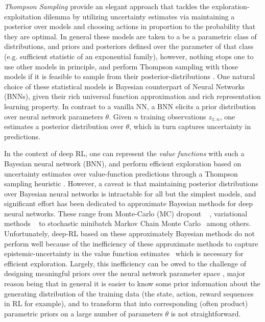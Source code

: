 \documentclass[10pt]{article}
\begin{document}
\textit{Thompson Sampling} \citep{thompson1933likelihood, russo2018tutorial, riquelme2018deep} provide an elegant approach that tackles the exploration-exploitation dilemma by utilizing uncertainty estimates via maintaining a posterior over models and choosing actions in proportion to the probability that they are optimal. In general these models are taken to a be a parametric class of distributions, and priors and posteriors defined over the parameter of that class (e.g. sufficient statistic of an exponential family), however, nothing stops one to use other models in principle, and perform Thompson sampling with those models if it is feasible to sample from their posterior-distributions \cite{riquelme2018deep}. One natural choice of these statistical models is Bayesian counterpart of Neural Networks (BNNs), given their rich universal function approximation and rich representation learning property. In contrast to a vanilla NN, a BNN elicits a prior distribution over neural network parameters $\theta$. Given $n$ training observations $z_{1:n}$, one estimates a posterior distribution over $\theta$, which in turn
captures uncertainty in predictions.  

In the context of deep RL,  one can represent the \textit{value functions} with such a Bayesian neural network (BNN), and perform efficient exploration based on uncertainty estimates over value-function predictions through a Thompson sampling heuristic . However, a caveat is that maintaining posterior distributions over Bayesian neural networks is intractable for all but the simplest
models, and significant effort has been dedicated to approximate Bayesian methods for deep
neural networks. These range from Monte-Carlo (MC) dropout ~\citep{gal2016dropout} , variational methods ~\citep{blundell2015weight} to stochastic minibatch Markov Chain Monte Carlo~\citep{neal2012bayesian} among others. Unfortunately, deep-RL based on these approximately Bayesian methods do not perform well  because of the inefficiency of these approximate methods to capture epistemic-uncertainty in the value function estimates~\citep{osband2018randomized} which is necessary for efficient exploration. Largely, this inefficiency can be owed to the challenge of designing meaningful priors over
the neural network parameter space \citep{arbel2023primer}, major reason being that in general it is easier to know some prior information about the generating distribution of the training data (the state, action, reward sequences in RL for example), and to transform that into corresponding (often product) parametric priors on a large number of parameters $\theta$ is not straightforward.  
\end{document}
